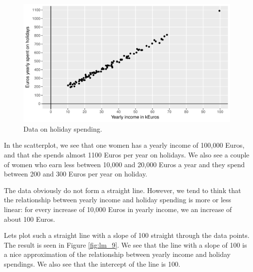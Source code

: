 \documentclass[]{report}\usepackage[]{graphicx}\usepackage[]{color}
\makeatletter
\def\maxwidth{ %
  \ifdim\Gin@nat@width>\linewidth
    \linewidth
  \else
    \Gin@nat@width
  \fi
}
\newenvironment{knitrout}{}{} %
\makeatother
\begin{document}
\begin{knitrout}
\color{fgcolor}\begin{figure}

{\centering \includegraphics[width=\maxwidth]{figure/lm_8-1} 

}

\caption[Data on holiday spending]{Data on holiday spending.}\label{fig:lm_8}
\end{figure}


\end{knitrout}

In the scatterplot, we see that one women has a yearly income of 100,000 Euros, and that she spends almost 1100 Euros per year on holidays. We also see a couple of women who earn less between 10,000 and 20,000 Euros a year and they spend between 200 and 300 Euros per year on holiday.

The data obviously do not form a straight line. However, we tend to think that the relationship between yearly income and holiday spending is more or less linear: for every increase of 10,000 Euros in yearly income, we an increase of about 100 Euros.

Lets plot such a straight line with a slope of 100 straight through the data points. The result is seen in Figure \ref{fig:lm_9}. We see that the line with a slope of 100 is a nice approximation of the relationship between yearly income and holiday spendings. We also see that the intercept of the line is 100.
\end{document}
